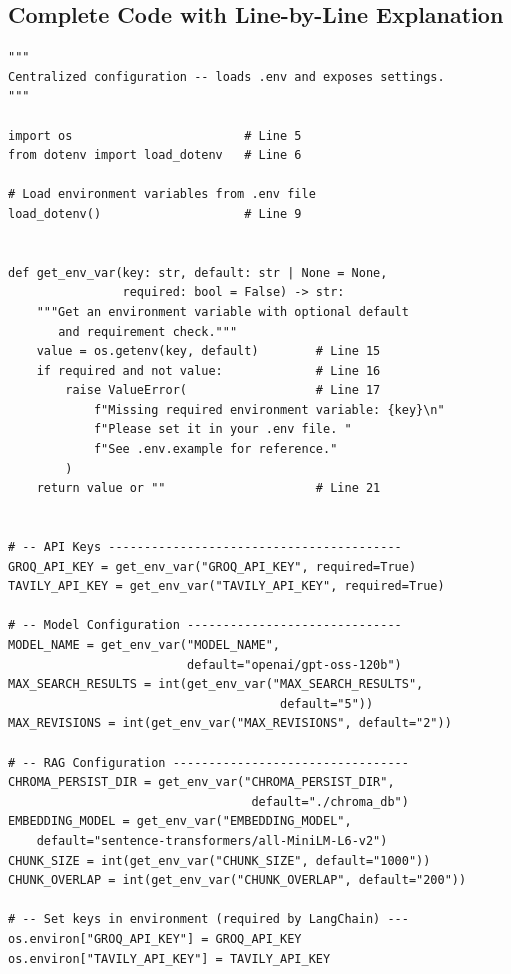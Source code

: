 \documentclass[12pt, a4paper]{article}
\begin{document}
\subsection{Complete Code with Line-by-Line Explanation}

\begin{lstlisting}[style=pythonstyle, title={\color{accentgreen}\faIcon{file} config/setting.py --- Full Code}]
"""
Centralized configuration -- loads .env and exposes settings.
"""

import os                        # Line 5
from dotenv import load_dotenv   # Line 6

# Load environment variables from .env file
load_dotenv()                    # Line 9


def get_env_var(key: str, default: str | None = None,
                required: bool = False) -> str:
    """Get an environment variable with optional default
       and requirement check."""
    value = os.getenv(key, default)        # Line 15
    if required and not value:             # Line 16
        raise ValueError(                  # Line 17
            f"Missing required environment variable: {key}\n"
            f"Please set it in your .env file. "
            f"See .env.example for reference."
        )
    return value or ""                     # Line 21


# -- API Keys -----------------------------------------
GROQ_API_KEY = get_env_var("GROQ_API_KEY", required=True)
TAVILY_API_KEY = get_env_var("TAVILY_API_KEY", required=True)

# -- Model Configuration ------------------------------
MODEL_NAME = get_env_var("MODEL_NAME",
                         default="openai/gpt-oss-120b")
MAX_SEARCH_RESULTS = int(get_env_var("MAX_SEARCH_RESULTS",
                                      default="5"))
MAX_REVISIONS = int(get_env_var("MAX_REVISIONS", default="2"))

# -- RAG Configuration ---------------------------------
CHROMA_PERSIST_DIR = get_env_var("CHROMA_PERSIST_DIR",
                                  default="./chroma_db")
EMBEDDING_MODEL = get_env_var("EMBEDDING_MODEL",
    default="sentence-transformers/all-MiniLM-L6-v2")
CHUNK_SIZE = int(get_env_var("CHUNK_SIZE", default="1000"))
CHUNK_OVERLAP = int(get_env_var("CHUNK_OVERLAP", default="200"))

# -- Set keys in environment (required by LangChain) ---
os.environ["GROQ_API_KEY"] = GROQ_API_KEY
os.environ["TAVILY_API_KEY"] = TAVILY_API_KEY
\end{lstlisting}
\end{document}
